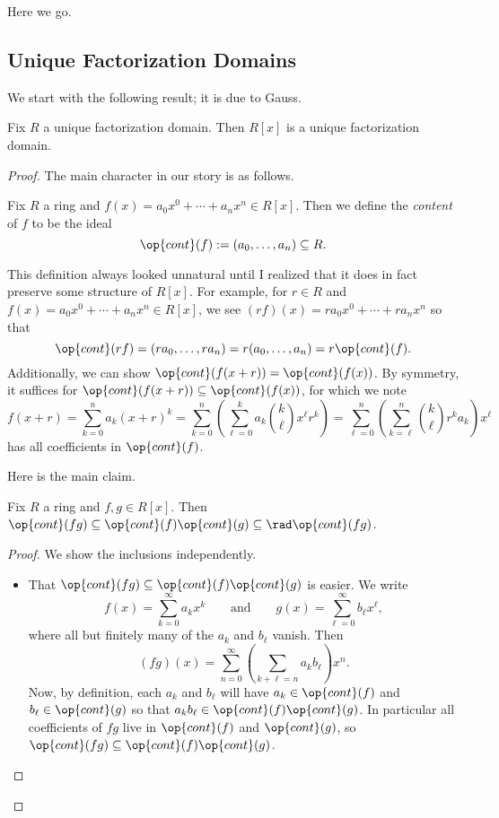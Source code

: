 
Here we go.

\subsection{Unique Factorization Domains}

We start with the following result; it is due to Gauss.
\begin{theorem} \label{thm:rxisufd}
	Fix $R$ a unique factorization domain. Then $R[x]$ is a unique factorization domain.
\end{theorem}
\begin{proof}
	The main character in our story is as follows.
	\begin{definition}[Content]
		Fix $R$ a ring and $f(x)=a_0x^0+\cdots+a_nx^n\in R[x]$. Then we define the \textit{content} of $f$ to be the ideal
		\[\op{cont}(f):=(a_0,\ldots,a_n)\subseteq R.\]
	\end{definition}
	\begin{remark}[Nir]
		This definition always looked unnatural until I realized that it does in fact preserve some structure of $R[x]$. For example, for $r\in R$ and $f(x)=a_0x^0+\cdots+a_nx^n\in R[x]$, we see $(rf)(x)=ra_0x^0+\cdots+ra_nx^n$ so that
		\[\op{cont}(rf)=(ra_0,\ldots,ra_n)=r(a_0,\ldots,a_n)=r\op{cont}(f).\]
		Additionally, we can show $\op{cont}(f(x+r))=\op{cont}(f(x))$. By symmetry, it suffices for $\op{cont}(f(x+r))\subseteq\op{cont}(f(x))$, for which we note
		\[f(x+r)=\sum_{k=0}^na_k(x+r)^k=\sum_{k=0}^n\left(\sum_{\ell=0}^ka_k\binom k\ell x^\ell r^k\right)=\sum_{\ell=0}^n\left(\sum_{k=\ell}^n\binom k\ell r^ka_k\right)x^\ell\]
		has all coefficients in $\op{cont}(f)$.
	\end{remark}
	Here is the main claim.
	\begin{lemma}[Gauss] \label{lem:gauss}
		Fix $R$ a ring and $f,g\in R[x]$. Then $\op{cont}(fg)\subseteq\op{cont}(f)\op{cont}(g)\subseteq\rad\op{cont}(fg)$.
	\end{lemma}
	\begin{proof}
		We show the inclusions independently.
		\begin{itemize}
			\item That $\op{cont}(fg)\subseteq\op{cont}(f)\op{cont}(g)$ is easier. We write
			\[f(x)=\sum_{k=0}^\infty a_kx^k\qquad\text{and}\qquad g(x)=\sum_{\ell=0}^\infty b_\ell x^\ell,\]
			where all but finitely many of the $a_k$ and $b_\ell$ vanish. Then
			\[(fg)(x)=\sum_{n=0}^\infty\left(\sum_{k+\ell=n}a_kb_\ell\right)x^n.\]
			Now, by definition, each $a_k$ and $b_\ell$ will have $a_k\in\op{cont}(f)$ and $b_\ell\in\op{cont}(g)$ so that $a_kb_\ell\in\op{cont}(f)\op{cont}(g)$. In particular all coefficients of $fg$ live in $\op{cont}(f)$ and $\op{cont}(g)$, so $\op{cont}(fg)\subseteq\op{cont}(f)\op{cont}(g)$.


\end{itemize}
\end{proof}
\end{proof}

